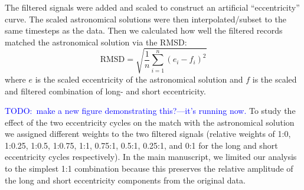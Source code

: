 \documentclass[draft]{agujournal2019}
\newcommand{\ijk}{\textcolor{blue}}
\begin{document}
The filtered signals were added and scaled to construct an artificial ``eccentricity'' curve.
The scaled astronomical solutions were then interpolated/subset to the same timesteps as the data.
Then we calculated how well the filtered records matched the astronomical solution via the \gls{RMSD}:
\begin{equation}\label{eqn:rmsd}
    \text{RMSD} = \sqrt{\frac{1}{n}\sum_{i=1}^{n}(e_{i} - f_{i})^{2}}
\end{equation}
where \(e\) is the scaled eccentricity of the astronomical solution and \(f\) is the scaled and filtered combination of long- and short eccentricity.

\ijk{TODO:\ make a new figure demonstrating this?---it's running now.}
To study the effect of the two eccentricity cycles on the match with the astronomical solution
we assigned different weights to the two filtered signals
(relative weights of 1:0, 1:0.25, 1:0.5, 1:0.75, 1:1, 0.75:1, 0.5:1, 0.25:1, and 0:1 for the long and short eccentricity cycles respectively).
In the main manuscript, we limited our analysis to the simplest 1:1 combination because this preserves the relative amplitude of the long and short eccentricity components from the original data.
\end{document}
